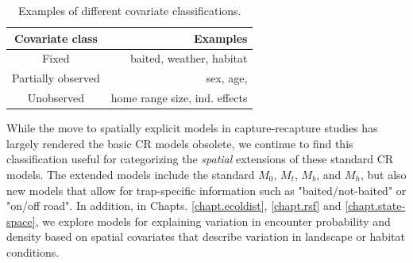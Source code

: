 \begin{table}[ht]
\centering
\caption{Examples of different covariate classifications.}
\begin{tabular}{cr}
\hline \hline
Covariate class & Examples \\
\hline 
Fixed & baited, weather, habitat\\
Partially observed & sex, age, \\
Unobserved &  home range size, ind. effects  \\ \hline
\end{tabular}
\label{covariates.tab.covobs}
\end{table}

While the move to spatially explicit models in capture-recapture
studies has largely rendered the basic CR models
\citep{otis_etal:1978} obsolete, we continue to find this
classification useful for categorizing the {\it spatial} extensions of
these standard CR models.  The extended models include the standard
$M_0$, $M_t$, $M_b$, and $M_h$, but also new models that allow for
trap-specific information such as "baited/not-baited" or "on/off
road".  In addition, in Chapts. \ref{chapt.ecoldist}, \ref{chapt.rsf}
and \ref{chapt.state-space}, we explore models for
explaining variation in encounter probability and density based on
spatial covariates that describe variation in landscape or habitat
conditions.

